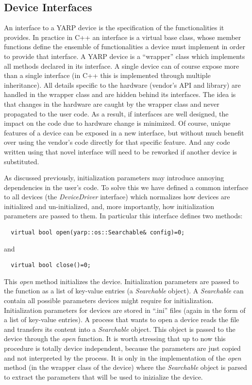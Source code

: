 \subsection{Device Interfaces}
An interface to a YARP device is the specification of the functionalities
it provides. In practice in C++ an interface is a virtual base class, whose 
member functions define the ensemble of  functionalities a device must 
implement in order to provide that interface.  A YARP device is a 
``wrapper'' class which implements all methods declared in its interface. 
A single device can of course expose more than a single interface 
(in C++ this is implemented through multiple
inheritance). All details specific to the hardware 
(vendor's API and library) are handled in the wrapper class and are 
hidden behind its interfaces. 
The idea is that changes in the hardware are caught by the wrapper class 
and never propagated to the user code. As a result, if interfaces are 
well designed, the impact on the code due to hardware change is minimized. 
%
Of course, unique features of a device can be exposed in a new interface,
but without much benefit over using the vendor's code directly for that
specific feature.  And any code written using that novel interface will
need to be reworked if another device is substituted.

As discussed previously, initialization parameters may introduce annoying 
dependencies in the user's code. To solve this we have defined a common 
interface to all devices (the 
\emph{DeviceDriver} interface) which normalizes how devices are initialized
and un-initialized, and, more importantly, how initialization parameters 
are passed to them. In particular this interface defines two methods:
\begin{verbatim}
  virtual bool open(yarp::os::Searchable& config)=0;
\end{verbatim}
and
\begin{verbatim}
  virtual bool close()=0;
\end{verbatim}
This \emph{open} method initializes the device. Initialization parameters 
are passed to the function as a list of key-value entries 
(a \emph{Searchable} object). A \emph{Searchable} can contain all 
possible parameters devices might require for initialization. Initialization 
parameters for devices 
are stored in ``.ini'' files (again in the form of a list of key-value 
entries). A process that wants to open a device reads 
the file and transfers its content into a \emph{Searchable} object. This 
object is passed to the device through the \emph{open} function. 
It is worth stressing that up to now this procedure is totally device 
independent, because the parameters are just copied and not interpreted 
by the process. It is only in the implementation of the \emph{open} method 
(in the wrapper class of the device) where the \emph{Searchable} object 
is parsed to extract the parameters that will be used to inizialize the 
device.

